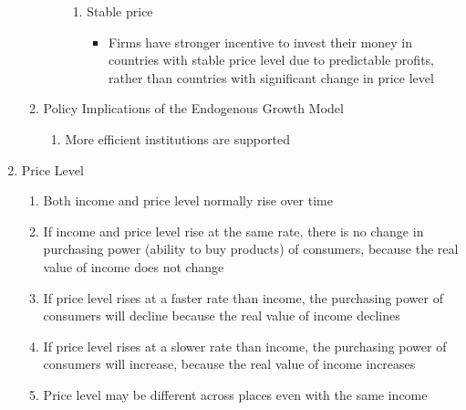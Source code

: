 \documentclass[12pt]{article}
\begin{document}
\begin{enumerate}
\begin{enumerate}
\begin{enumerate}
\begin{enumerate}
                  \item Stable price

                    \begin{itemize}

                      \item Firms have stronger incentive to invest their money in countries with stable price level due to predictable profits, rather than countries with significant change in price level

                    \end{itemize}

                \end{enumerate}

            \end{enumerate}

          \item Policy Implications of the Endogenous Growth Model

            \begin{enumerate}

              \item More efficient institutions are supported

            \end{enumerate}

        \end{enumerate}

      \item Price Level

        \begin{enumerate}

          \item Both income and price level normally rise over time

          \item If income and price level rise at the same rate, there is no change in purchasing power (ability to buy products) of consumers, because the real value of income does not change

          \item If price level rises at a faster rate than income, the purchasing power of consumers will decline because the real value of income declines

          \item If price level rises at a slower rate than income, the purchasing power of consumers will increase, because the real value of income increases

          \item Price level may be different across places even with the same income


\end{enumerate}
\end{enumerate}
\end{document}
